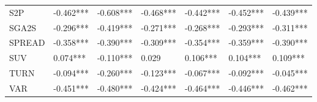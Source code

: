 \begin{tabular}{lllllll}
S2P     &  -0.462*** &  -0.608*** &  -0.468*** &  -0.442*** &  -0.452*** &  -0.439*** \\
SGA2S   &  -0.296*** &  -0.419*** &  -0.271*** &  -0.268*** &  -0.293*** &  -0.311*** \\
SPREAD  &  -0.358*** &  -0.390*** &  -0.309*** &  -0.354*** &  -0.359*** &  -0.390*** \\
SUV     &   0.074*** &  -0.110*** &      0.029 &   0.106*** &   0.104*** &   0.109*** \\
TURN    &  -0.094*** &  -0.260*** &  -0.123*** &  -0.067*** &  -0.092*** &  -0.045*** \\
VAR     &  -0.451*** &  -0.480*** &  -0.424*** &  -0.464*** &  -0.446*** &  -0.462*** \\
\bottomrule
\end{tabular}
